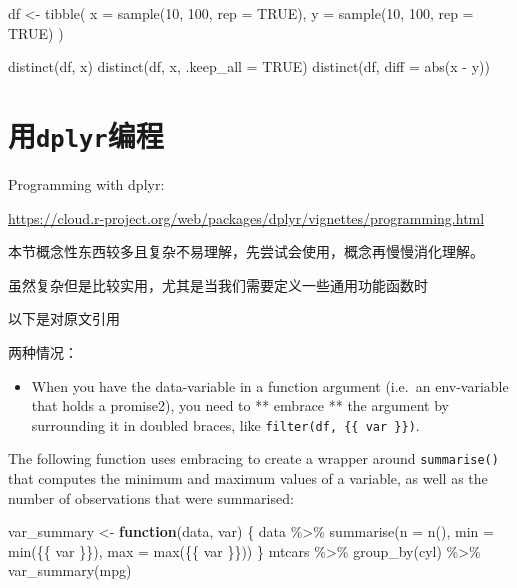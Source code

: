 \documentclass[
]{book}
\newenvironment{Shaded}{\begin{snugshade}}{\end{snugshade}}
\newcommand{\AttributeTok}[1]{\textcolor[rgb]{0.77,0.63,0.00}{#1}}
\newcommand{\ConstantTok}[1]{\textcolor[rgb]{0.00,0.00,0.00}{#1}}
\newcommand{\ControlFlowTok}[1]{\textcolor[rgb]{0.13,0.29,0.53}{\textbf{#1}}}
\newcommand{\DecValTok}[1]{\textcolor[rgb]{0.00,0.00,0.81}{#1}}
\newcommand{\FunctionTok}[1]{\textcolor[rgb]{0.00,0.00,0.00}{#1}}
\newcommand{\NormalTok}[1]{#1}
\newcommand{\OtherTok}[1]{\textcolor[rgb]{0.56,0.35,0.01}{#1}}
\newcommand{\SpecialCharTok}[1]{\textcolor[rgb]{0.00,0.00,0.00}{#1}}
\providecommand{\tightlist}{%
  \setlength{\itemsep}{0pt}\setlength{\parskip}{0pt}}
\begin{document}
\begin{Shaded}
\begin{Highlighting}[]
\NormalTok{df }\OtherTok{\textless{}{-}} \FunctionTok{tibble}\NormalTok{(}
  \AttributeTok{x =} \FunctionTok{sample}\NormalTok{(}\DecValTok{10}\NormalTok{, }\DecValTok{100}\NormalTok{, }\AttributeTok{rep =} \ConstantTok{TRUE}\NormalTok{),}
  \AttributeTok{y =} \FunctionTok{sample}\NormalTok{(}\DecValTok{10}\NormalTok{, }\DecValTok{100}\NormalTok{, }\AttributeTok{rep =} \ConstantTok{TRUE}\NormalTok{)}
\NormalTok{)}

\FunctionTok{distinct}\NormalTok{(df, x)}
\FunctionTok{distinct}\NormalTok{(df, x, }\AttributeTok{.keep\_all =} \ConstantTok{TRUE}\NormalTok{)}
\FunctionTok{distinct}\NormalTok{(df, }\AttributeTok{diff =} \FunctionTok{abs}\NormalTok{(x }\SpecialCharTok{{-}}\NormalTok{ y))}
\end{Highlighting}
\end{Shaded}

\hypertarget{ux7528dplyrux7f16ux7a0b}{%
\section{\texorpdfstring{用\texttt{dplyr}编程}{用dplyr编程}}\label{ux7528dplyrux7f16ux7a0b}}

Programming with dplyr:

\url{https://cloud.r-project.org/web/packages/dplyr/vignettes/programming.html}

本节概念性东西较多且复杂不易理解，先尝试会使用，概念再慢慢消化理解。

虽然复杂但是比较实用，尤其是当我们需要定义一些通用功能函数时

以下是对原文引用

两种情况：

\begin{itemize}
\tightlist
\item
  When you have the data-variable in a function argument (i.e.~an env-variable that holds a promise2), you need to ** embrace ** the argument by surrounding it in doubled braces, like \texttt{filter(df,\ \{\{\ var\ \}\})}.
\end{itemize}

The following function uses embracing to create a wrapper around \texttt{summarise()} that computes the minimum and maximum values of a variable, as well as the number of observations that were summarised:

\begin{Shaded}
\begin{Highlighting}[]
\NormalTok{var\_summary }\OtherTok{\textless{}{-}} \ControlFlowTok{function}\NormalTok{(data, var) \{}
\NormalTok{  data }\SpecialCharTok{\%\textgreater{}\%}
    \FunctionTok{summarise}\NormalTok{(}\AttributeTok{n =} \FunctionTok{n}\NormalTok{(), }\AttributeTok{min =} \FunctionTok{min}\NormalTok{(\{\{ var \}\}), }\AttributeTok{max =} \FunctionTok{max}\NormalTok{(\{\{ var \}\}))}
\NormalTok{\}}
\NormalTok{mtcars }\SpecialCharTok{\%\textgreater{}\%} 
  \FunctionTok{group\_by}\NormalTok{(cyl) }\SpecialCharTok{\%\textgreater{}\%} 
  \FunctionTok{var\_summary}\NormalTok{(mpg)}
\end{Highlighting}
\end{Shaded}
\end{document}
